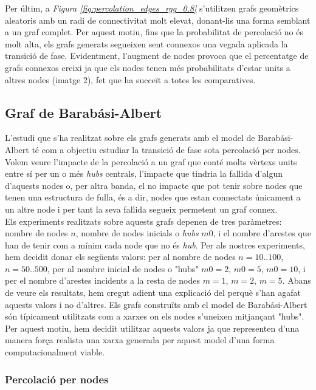 \documentclass[a4paper]{article}
\begin{document}
	Per últim, a \textit{Figura \ref{fig:percolation_edges_rgg_0.8}} s'utilitzen grafs geomètrics aleatoris amb un radi de connectivitat molt elevat, donant-lis una forma semblant a un graf complet. Per aquest motiu, fins que la probabilitat de percolació no és molt alta, els grafs generats segueixen
	sent connexos una vegada aplicada la transició de fase. Evidentment, l'augment de nodes provoca que el percentatge de grafs connexos creixi ja que els nodes tenen més probabilitats d'estar units a altres nodes (imatge 2), fet que ha succeït a totes les comparatives.
	
	\subsection{Graf de Barabási-Albert}
	
	L'estudi que s'ha realitzat sobre els grafs generats amb el model de Barabási-Albert té com a objectiu estudiar la transició de fase sota percolació per nodes. Volem veure l'impacte de la percolació a un graf que conté molts vèrtexs units entre sí per un o més \textit{hubs} centrals, l'impacte que tindria la fallida d'algun d'aquests nodes o, per altra banda, el no impacte que pot tenir sobre nodes que tenen una estructura de fulla, és a dir, nodes que estan connectats únicament a un altre node i per tant la seva fallida segueix permetent un graf connex. \\
	
	Els experiments realitzats sobre aquests grafs depenen de tres paràmetres: nombre de nodes $n$, nombre de nodes inicials o \textit{hubs} $m0$, i el nombre d'arestes que han de tenir com a mínim cada node que no és \textit{hub}. Per als nostres experiments, hem decidit donar els següents valors: per al nombre de nodes $n = 10..100$, $n = 50..500$, per al nombre inicial de nodes o "hubs" $m0 = 2$, $m0 = 5$, $m0 = 10$, i per el nombre d'arestes incidents a la resta de nodes $m = 1$, $m = 2$, $m = 5$. Abans de veure els resultats, hem cregut adient una explicació del perquè s'han agafat aquests valors i no d'altres. Els grafs construïts amb el model de Barabási-Albert són típicament utilitzats com a xarxes on els nodes s'uneixen mitjançant "hubs". Per aquest motiu, hem decidit utilitzar aquests valors ja que representen d'una manera força realista una xarxa generada per aquest model d'una forma computacionalment viable. \\
	
	\subsubsection{Percolació per nodes}
	
\end{document}
